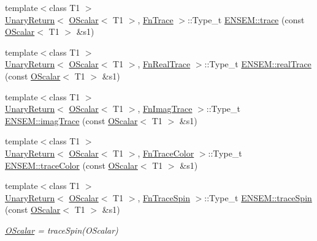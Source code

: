 \begin{DoxyCompactItemize}
\item 
{\footnotesize template$<$class T1 $>$ }\\\mbox{\hyperlink{structENSEM_1_1UnaryReturn}{Unary\+Return}}$<$ \mbox{\hyperlink{classENSEM_1_1OScalar}{O\+Scalar}}$<$ T1 $>$, \mbox{\hyperlink{structENSEM_1_1FnTrace}{Fn\+Trace}} $>$\+::Type\+\_\+t \mbox{\hyperlink{group__obsscalar_ga86ed3e3adf57442824b4275e5ea2a3fd}{E\+N\+S\+E\+M\+::trace}} (const \mbox{\hyperlink{classENSEM_1_1OScalar}{O\+Scalar}}$<$ T1 $>$ \&s1)
\item 
{\footnotesize template$<$class T1 $>$ }\\\mbox{\hyperlink{structENSEM_1_1UnaryReturn}{Unary\+Return}}$<$ \mbox{\hyperlink{classENSEM_1_1OScalar}{O\+Scalar}}$<$ T1 $>$, \mbox{\hyperlink{structENSEM_1_1FnRealTrace}{Fn\+Real\+Trace}} $>$\+::Type\+\_\+t \mbox{\hyperlink{group__obsscalar_ga3314cb92fadaf86f0fa6dfe446ddc388}{E\+N\+S\+E\+M\+::real\+Trace}} (const \mbox{\hyperlink{classENSEM_1_1OScalar}{O\+Scalar}}$<$ T1 $>$ \&s1)
\item 
{\footnotesize template$<$class T1 $>$ }\\\mbox{\hyperlink{structENSEM_1_1UnaryReturn}{Unary\+Return}}$<$ \mbox{\hyperlink{classENSEM_1_1OScalar}{O\+Scalar}}$<$ T1 $>$, \mbox{\hyperlink{structENSEM_1_1FnImagTrace}{Fn\+Imag\+Trace}} $>$\+::Type\+\_\+t \mbox{\hyperlink{group__obsscalar_ga1dff0d4b73bbb026e6a9287ffd531523}{E\+N\+S\+E\+M\+::imag\+Trace}} (const \mbox{\hyperlink{classENSEM_1_1OScalar}{O\+Scalar}}$<$ T1 $>$ \&s1)
\item 
{\footnotesize template$<$class T1 $>$ }\\\mbox{\hyperlink{structENSEM_1_1UnaryReturn}{Unary\+Return}}$<$ \mbox{\hyperlink{classENSEM_1_1OScalar}{O\+Scalar}}$<$ T1 $>$, \mbox{\hyperlink{structENSEM_1_1FnTraceColor}{Fn\+Trace\+Color}} $>$\+::Type\+\_\+t \mbox{\hyperlink{group__obsscalar_ga6c49507babe850f36f0765318257dc08}{E\+N\+S\+E\+M\+::trace\+Color}} (const \mbox{\hyperlink{classENSEM_1_1OScalar}{O\+Scalar}}$<$ T1 $>$ \&s1)
\item 
{\footnotesize template$<$class T1 $>$ }\\\mbox{\hyperlink{structENSEM_1_1UnaryReturn}{Unary\+Return}}$<$ \mbox{\hyperlink{classENSEM_1_1OScalar}{O\+Scalar}}$<$ T1 $>$, \mbox{\hyperlink{structENSEM_1_1FnTraceSpin}{Fn\+Trace\+Spin}} $>$\+::Type\+\_\+t \mbox{\hyperlink{group__obsscalar_gaec323bb3e795f6f48bd41e629e4c38ab}{E\+N\+S\+E\+M\+::trace\+Spin}} (const \mbox{\hyperlink{classENSEM_1_1OScalar}{O\+Scalar}}$<$ T1 $>$ \&s1)
\begin{DoxyCompactList}\small\item\em \mbox{\hyperlink{classENSEM_1_1OScalar}{O\+Scalar}} = trace\+Spin(\+O\+Scalar) \end{DoxyCompactList}\item 

\end{DoxyCompactItemize}
